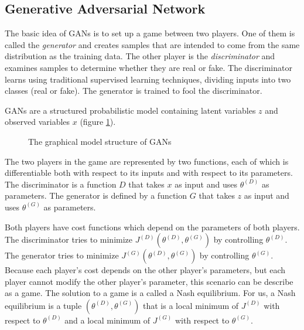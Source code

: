 \documentclass[12pt]{report}
\begin{document}
\subsection{Generative Adversarial Network}
\label{sec:back:gan}

The basic idea of GANs \cite{noauthor_gan_2017, goodfellow_generative_2016, goodfellow_generative_2014, goodfellow_nips_2017} is to set up a game between two players.
One of them is called the \textit{generator} and creates samples that are intended to come from the same distribution as the training data.
The other player is the \textit{discriminator} and examines samples to determine whether they are real or fake.
The discriminator learns using traditional supervised learning techniques, dividing inputs into two classes (real or fake).
The generator is trained to fool the discriminator.

GANs are a structured probabilistic model containing latent variables $z$ and observed variables $x$ (figure \ref{fig:gan-latent-space}).

\begin{figure}[htbp]
\begin{center}
\caption{The graphical model structure of GANs}
\label{fig:gan-latent-space}
\end{center}
\end{figure}

The two players in the game are represented by two functions, each of which is differentiable both with respect to its inputs and with respect to its parameters.
The discriminator is a function $D$ that takes $x$ as input and uses $\theta^{(D)}$ as parameters.
The generator is defined by a function $G$ that takes $z$ as input and uses $\theta^{(G)}$ as parameters.

Both players have cost functions which depend on the parameters of both players.
The discriminator tries to minimize $J^{(D)} (\theta^{(D)}, \theta^{(G)})$ by controlling $\theta^{(D)}$.
The generator tries to minimize $J^{(G)} (\theta^{(D)}, \theta^{(G)})$ by controlling $\theta^{(G)}$.
Because each player’s cost depends on the other player’s parameters, but each player cannot modify the other player’s parameter, this scenario can be describe as a game.
The solution to a game is a called a Nash equilibrium.
For us, a Nash equilibrium is a tuple $(\theta^{(D)}, \theta^{(G)})$ that is a local minimum of $J^{(D)}$ with respect to $\theta^{(D)}$ and a local minimum of $J^{(G)}$ with respect to $\theta^{(G)}$.
\end{document}
